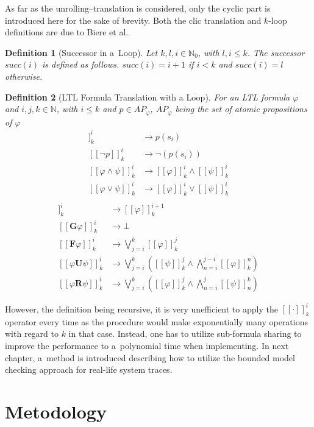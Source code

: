 \documentclass[12pt,oneside,draft]{fithesis}
\newcommand{\mNatural}{\mathbb{N}}
\newcommand{\bF}{\mathbf{F}}
\newcommand{\bG}{\mathbf{G}}
\newcommand{\bX}{\mathbf{X}}
\newcommand{\bU}{\mathbf{U}}
\newcommand{\bR}{\mathbf{R}}
\newtheorem{mydef}{Definition}
\begin{document}
As far as the unrolling--translation is considered, only the cyclic part
is introduced here for the sake of brevity.
Both the clic translation and $k$-loop definitions are due to Biere
et al.
\begin{mydef}[Successor in a~Loop]
Let $k,l,i\in\mNatural_0$, with $l,i \leq k$. The successor $succ(i)$ is
defined as follows. $succ(i)=i+1$ if $i<k$ and $succ(i)=l$ otherwise.
\end{mydef}
\begin{mydef}[LTL Formula Translation with a Loop]
For an LTL formula $\varphi$ and $i,j,k\in\mNatural$, with $i\leq k$ and
$p\in {AP}_\varphi$, ${AP}_\varphi$ being the set of atomic propositions
of $\varphi$
\begin{align}
	[[p]]_k^i&\rightarrow p(s_i)\\
	[[\neg p]]_k^i&\rightarrow\neg(p(s_i))\\
	[[\varphi\wedge\psi]]_k^i&\rightarrow
		[[\varphi]]_k^i\wedge[[\psi]]_k^i\\
	[[\varphi\vee\psi]]_k^i&\rightarrow
		[[\varphi]]_k^i\vee[[\psi]]_k^i\\
\end{align}
\begin{align}
	[[\bX\varphi]]_k^i&\rightarrow[[\varphi]]_k^{i+1}\\
	[[\bG\varphi]]_k^i&\rightarrow\bot\\
	[[\bF\varphi]]_k^i&\rightarrow\bigvee_{j=i}^k[[\varphi]]_k^j\\
	[[\varphi\bU\psi]]_k^i&\rightarrow\bigvee_{j=i}^k\left(
		[[\psi]]_k^j\wedge\bigwedge_{n=i}^{j-i}[[\varphi]]_k^n
	\right)\\
	[[\varphi\bR\psi]]_k^i&\rightarrow\bigvee_{j=i}^k\left(
		[[\varphi]]_k^j\wedge\bigwedge_{n=i}^j[[\psi]]_n^k
	\right)
\end{align} 
\end{mydef}
However, the definition being recursive, it is very unefficient to
apply the $[[\cdot]]_k^i$ operator every time as the procedure would
make exponentially many operations with regard to $k$ in that case.
Instead, one has to utilize sub-formula sharing to improve the
performance to a~polynomial time when implementing\cite{biere}. In next
chapter, a~method is introduced describing how to utilize the bounded
model checking approach for real-life system traces.

\chapter{Metodology}
\end{document}
